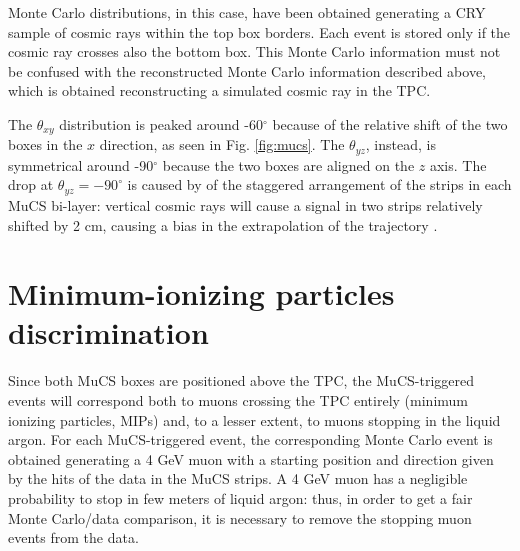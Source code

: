 \documentclass[a4paper]{scrartcl}
\begin{document}
Monte Carlo distributions, in this case, have been obtained generating a CRY \cite{cry} sample of cosmic rays within the top box borders. Each event is stored only if the cosmic ray crosses also the bottom box. This Monte Carlo information must not be confused with the reconstructed Monte Carlo information described above, which is obtained reconstructing a simulated cosmic ray in the TPC.



The $\theta_{xy}$ distribution is peaked around -60$^{\circ}$ because of the relative shift of the two boxes in the $x$ direction, as seen in Fig. \ref{fig:mucs}. The $\theta_{yz}$, instead, is symmetrical around -90$^{\circ}$ because the two boxes are aligned on the $z$ axis. The drop at $\theta_{yz}=-90^{\circ}$ is caused by of the staggered arrangement of the strips in each MuCS bi-layer: vertical cosmic rays will cause a signal in two strips relatively shifted by 2 cm, causing a bias in the extrapolation of the trajectory  \cite{mucsextra}.



\section{Minimum-ionizing particles discrimination} \label{sec:mip}

Since both MuCS boxes are positioned above the TPC, the MuCS-triggered events will correspond both to muons crossing the TPC entirely (minimum ionizing particles, MIPs) and, to a lesser extent, to muons stopping in the liquid argon. For each MuCS-triggered event, the corresponding Monte Carlo event is obtained generating a 4 GeV muon with a starting position and direction given by the hits of the data in the MuCS strips. A 4 GeV muon has a negligible probability to stop in few meters of liquid argon: thus, in order to get a fair Monte Carlo/data comparison, it is necessary to remove the stopping muon events from the data.
\end{document}
